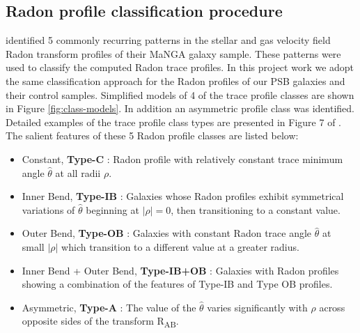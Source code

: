 \subsection{Radon profile classification procedure}
\label{sec:Radon-classification}

\cite{2018MNRAS.480.2217S} identified 5 commonly recurring patterns in the stellar and gas velocity field Radon transform profiles of their MaNGA galaxy sample. These patterns were used to classify the computed Radon trace profiles. In this project work we adopt the same classification approach for the Radon profiles of our PSB galaxies and their control samples. Simplified models of 4 of the trace profile classes are shown in Figure \ref{fig:class-models}. In addition an asymmetric profile class was identified. Detailed examples of the trace profile class types are presented in Figure 7 of \cite{2018MNRAS.480.2217S}. The salient features of these 5 Radon profile classes are listed below:

\begin{itemize}
    \item Constant, \textbf{Type-C} : Radon profile with relatively constant trace minimum angle $\hat{\theta}$ at all radii $\rho$.
    \item Inner Bend, \textbf{Type-IB} : Galaxies whose Radon profiles exhibit symmetrical variations of $\hat{\theta}$ beginning at $|\rho|=0$, then transitioning to a constant value. 
    \item Outer Bend, \textbf{Type-OB} : Galaxies with constant Radon trace angle $\hat{\theta}$  at small $|\rho|$ which transition to a different value at a greater radius. 
    \item Inner Bend + Outer Bend, \textbf{Type-IB+OB} : Galaxies with Radon profiles showing a combination of the features of Type-IB and Type OB profiles.
    \item Asymmetric, \textbf{Type-A} : The value of the $\hat{\theta}$ varies significantly with $\rho$ across opposite sides of the transform R\textsubscript{AB}. 
 \end{itemize}

